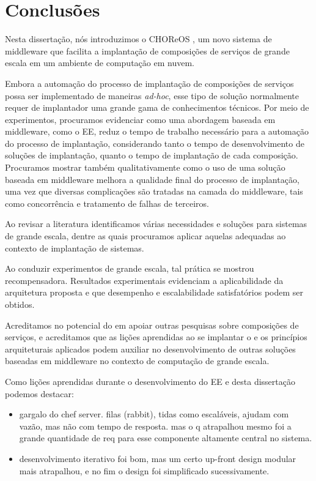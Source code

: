 \chapter{Conclusões}
\label{cap:conclusoes}


Nesta dissertação, nós introduzimos o CHOReOS \ee,
um novo sistema de middleware que facilita a implantação de composições
de serviços de grande escala em um ambiente de computação em nuvem.

Embora a automação do processo de implantação de composições de serviços
possa ser implementado de maneiras \emph{ad-hoc},
esse tipo de solução normalmente requer de implantador
uma grande gama de conhecimentos técnicos.
Por meio de experimentos, procuramos evidenciar como
uma abordagem baseada em middleware, como o EE,
reduz o tempo de trabalho necessário para a automação
do processo de implantação, considerando tanto o tempo
de desenvolvimento de soluções de implantação,
quanto o tempo de implantação de cada composição.
Procuramos mostrar também qualitativamente como
o uso de uma solução baseada em middleware
melhora a qualidade final do processo de implantação,
uma vez que diversas complicações são tratadas
na camada do middleware, tais como concorrência
e tratamento de falhas de terceiros.

Ao revisar a literatura identificamos várias necessidades e soluções
para sistemas de grande escala, dentre as quais procuramos aplicar
aquelas adequadas ao contexto de implantação de sistemas.

Ao conduzir experimentos de grande escala,
tal prática se mostrou recompensadora.
Resultados experimentais evidenciam a aplicabilidade da arquitetura proposta
e que desempenho e escalabilidade satisfatórios podem ser obtidos.

Acreditamos no potencial do \ee em apoiar outras pesquisas
sobre composições de serviços, e acreditamos que as lições aprendidas
ao se implantar o \ee e os princípios arquiteturais aplicados
podem auxiliar no desenvolvimento de outras soluções baseadas
em middleware no contexto de computação de grande escala.

Como lições aprendidas durante o desenvolvimento do EE e desta dissertação podemos destacar:

\begin{itemize}
\item gargalo do chef server. filas (rabbit), tidas como escaláveis, ajudam com vazão, mas não com tempo de resposta. mas o q atrapalhou mesmo foi a grande quantidade de req para esse componente altamente central no sistema.
\item desenvolvimento iterativo foi bom, mas um certo up-front design modular mais atrapalhou, e no fim o design foi simplificado sucessivamente.
\end{itemize}




